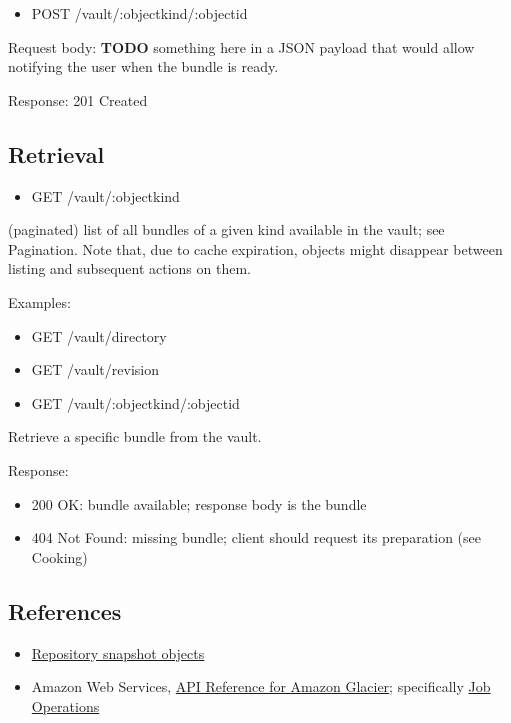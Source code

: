 \begin{itemize}
\itemsep1pt\parskip0pt
\item
  POST /vault/:objectkind/:objectid
\end{itemize}

Request body: \textbf{TODO} something here in a JSON payload that would
allow notifying the user when the bundle is ready.

Response: 201 Created

\subsection{Retrieval}\label{retrieval}

\begin{itemize}
\itemsep1pt\parskip0pt
\item
  GET /vault/:objectkind
\end{itemize}

(paginated) list of all bundles of a given kind available in the vault;
see Pagination. Note that, due to cache expiration, objects might
disappear between listing and subsequent actions on them.

Examples:

\begin{itemize}
\item
  GET /vault/directory
\item
  GET /vault/revision
\item
  GET /vault/:objectkind/:objectid
\end{itemize}

Retrieve a specific bundle from the vault.

Response:

\begin{itemize}
\itemsep1pt\parskip0pt
\item
  200 OK: bundle available; response body is the bundle
\item
  404 Not Found: missing bundle; client should request its preparation
  (see Cooking)
\end{itemize}

\subsection{References}\label{references}

\begin{itemize}
\itemsep1pt\parskip0pt
\item
  \href{https://wiki.softwareheritage.org/index.php?title=User:StefanoZacchiroli/Repository_snapshot_objects}{Repository
  snapshot objects}
\item
  Amazon Web Services,
  \href{http://docs.aws.amazon.com/amazonglacier/latest/dev/amazon-glacier-api.html}{API
  Reference for Amazon Glacier}; specifically
  \href{http://docs.aws.amazon.com/amazonglacier/latest/dev/job-operations.html}{Job
  Operations}
\end{itemize}

